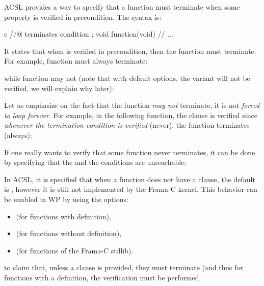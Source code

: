 ACSL provides a way to specify that a function must terminate when some property
is verified in precondition. The syntax is:



\begin{CodeBlock}{c}
//@ terminates condition ;
void function(void){
  // ...
}
\end{CodeBlock}



It states that when  is verified in precondition, then
the function must terminate. For example, function  must always
terminate:






while function  may not (note that with default options,
the variant will not be verified, we will explain why later):






Let us emphasize on the fact that the function {\em may not} terminate, it is
not {\em forced to loop forever}. For example, in the following function, the
 clause is verified since
{\em whenever the termination condition is verified} (never), the function
terminates (always):






\begin{Information}
  If one really wants to verify that some function never terminates, it can be
  done by specifying that the  and the 
  conditions are unreachable:
\end{Information}



\begin{Information}
  In ACSL, it is specified that when a function does not have a
   clause, the default is
  , however it is still not
  implemented by the Frama-C kernel. This behavior can be enabled in WP
  by using the options:
  \begin{itemize}
  \item {} (for functions with definition),
  \item {} (for functions without definition),
  \item {} (for functions of the Frama-C stdlib).
  \end{itemize}
  to claim that, unless a clause is provided, they must terminate (and thus
  for functions with a definition, the verification must be performed.
\end{Information}



